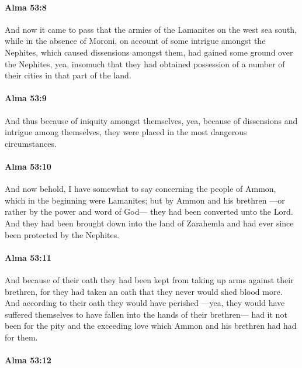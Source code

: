 		\paragraph{Alma 53:8} %
			\label{ALMA-53-8}

			And now it came to pass that the armies of the Lamanites on the west sea south,
			while in the absence of Moroni,
			on account of some intrigue amongst the Nephites,
			which caused dissensions amongst them,
			had gained some ground over the Nephites,
			yea, insomuch that they had obtained possession
			of a number of their cities in that part of the land.

		\paragraph{Alma 53:9} %
			\label{ALMA-53-9}

			And thus because of iniquity amongst themselves,
			yea, because of dissensions and intrigue among themselves,
			they were placed in the most dangerous circumstances.

		\paragraph{Alma 53:10} %
			\label{ALMA-53-10}

			And now behold, I have somewhat to say concerning the people of Ammon,
			which in the beginning were Lamanites;
			but by Ammon and his brethren
			---or rather by the power and word of God---
			they had been converted unto the Lord.
			And they had been brought down into the land of Zarahemla
			and had ever since been protected by the Nephites.

		\paragraph{Alma 53:11} %
			\label{ALMA-53-11}

			And because of their oath
			they had been kept from taking up arms against their brethren,
			for they had taken an oath that they never would shed blood more.
			And according to their oath they would have perished
			---yea, they would have suffered themselves
			to have fallen into the hands of their brethren---
			had it not been for the pity and the exceeding love
			which Ammon and his brethren had had for them.

		\paragraph{Alma 53:12} %
			\label{ALMA-53-12}

